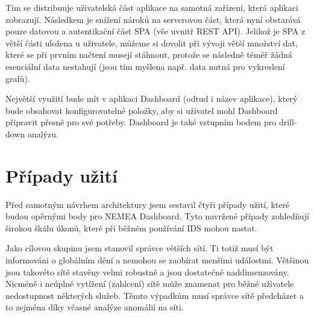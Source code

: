 Tím se distribuuje uživatelská část aplikace na samotná zařízení, která aplikaci zobrazují. Následkem je snížení nároků na serverovou část, která nyní obstarává pouze datovou a autentikační část SPA (vše uvnitř REST API). Jelikož je SPA z větší části uložena u uživatele, můžeme si dovolit při vývoji větší množství dat, které se při prvním načtení musejí stáhnout, protože se následně téměř žádná esenciální data nestahují (jsou tím myšlena např. data nutná pro vykreslení grafů).

Největší využití bude mít v aplikaci Dashboard (odtud i název aplikace), který bude obsahovat konfigurovatelné položky, aby si uživatel mohl Dashboard připravit přesně pro své potřeby. Dashboard je také vstupním bodem pro drill-down analýzu.

\section{Případy užití}
Před samotným návrhem architektury jsem sestavil čtyři případy užití, které budou opěrnými body pro NEMEA Dashboard. Tyto navržené případy zohledňují širokou škálu úkonů, které při běžném používání IDS mohou nastat.

Jako cílovou skupinu jsem stanovil správce větších sítí. Ti totiž musí být informováni o globálním dění a nemohou se zaobírat menšími událostmi. Většinou jsou takovéto sítě stavěny velmi robustně a jsou dostatečně naddimenzovány. Nicméně i neúplné vytížení (zahlcení) sítě může znamenat pro běžné uživatele nedostupnost některých služeb. Těmto výpadkům musí správce sítě předcházet a to zejména díky včasné analýze anomálií na síti.

